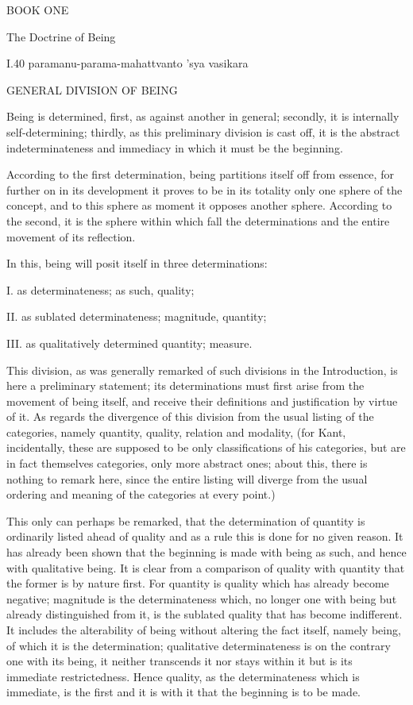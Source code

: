 
BOOK ONE

The Doctrine of Being

I.40
paramanu-parama-mahattvanto 'sya vasikara

GENERAL DIVISION OF BEING

Being is determined, first, as against another in general;
secondly, it is internally self-determining;
thirdly, as this preliminary division is cast off,
it is the abstract indeterminateness and immediacy
in which it must be the beginning.

According to the first determination,
being partitions itself off from essence,
for further on in its development it proves to be
in its totality only one sphere of the concept,
and to this sphere as moment it opposes another sphere.
According to the second, it is the sphere
within which fall the determinations
and the entire movement of its reflection.

In this, being will posit itself in three determinations:

I. as determinateness; as such, quality;

II. as sublated determinateness; magnitude, quantity;

III. as qualitatively determined quantity; measure.

This division, as was generally remarked of
such divisions in the Introduction,
is here a preliminary statement;
its determinations must first arise
from the movement of being itself,
and receive their definitions and justification by virtue of it.
As regards the divergence of this division from
the usual listing of the categories,
namely quantity, quality, relation and modality,
(for Kant, incidentally, these are supposed to be
only classifications of his categories,
but are in fact themselves categories,
only more abstract ones;
about this, there is nothing to remark here,
since the entire listing will diverge from
the usual ordering and meaning of
the categories at every point.)

This only can perhaps be remarked,
that the determination of quantity
is ordinarily listed ahead of quality and as a rule
this is done for no given reason.
It has already been shown that
the beginning is made with being as such,
and hence with qualitative being.
It is clear from a comparison of quality with quantity
that the former is by nature first.
For quantity is quality which has already become negative;
magnitude is the determinateness which,
no longer one with being but already distinguished from it,
is the sublated quality that has become indifferent.
It includes the alterability of being
without altering the fact itself,
namely being, of which it is the determination;
qualitative determinateness is on the contrary one with its being,
it neither transcends it nor stays within it
but is its immediate restrictedness.
Hence quality, as the determinateness which is immediate,
is the first and it is with it that the beginning is to be made.

